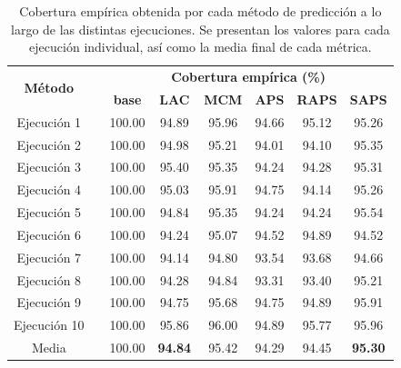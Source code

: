 \renewcommand{\arraystretch}{1.4}
\begin{table}[h]
    \centering
    \small
    \begin{tabular}{cccccccc}
    \toprule
    \multirow{2}{*}{\textbf{Método}} &  & \multicolumn{6}{c}{\textbf{Cobertura empírica (\%)}} \\ \cline{3-8} 
    &  & \textbf{base} & \textbf{LAC} & \textbf{MCM} & \textbf{APS} & \textbf{RAPS} & \textbf{SAPS} \\ \cline{1-1} \cline{3-8} 
    Ejecución 1 &  & 100.00 & 94.89 & 95.96 & 94.66 & 95.12 & 95.26 \\
    Ejecución 2 &  & 100.00 & 94.98 & 95.21 & 94.01 & 94.10 & 95.35 \\
    Ejecución 3 &  & 100.00 & 95.40 & 95.35 & 94.24 & 94.28 & 95.31 \\
    Ejecución 4 &  & 100.00 & 95.03 & 95.91 & 94.75 & 94.14 & 95.26 \\
    Ejecución 5 &  & 100.00 & 94.84 & 95.35 & 94.24 & 94.24 & 95.54 \\
    Ejecución 6 &  & 100.00 & 94.24 & 95.07 & 94.52 & 94.89 & 94.52 \\
    Ejecución 7 &  & 100.00 & 94.14 & 94.80 & 93.54 & 93.68 & 94.66 \\
    Ejecución 8 &  & 100.00 & 94.28 & 94.84 & 93.31 & 93.40 & 95.21 \\
    Ejecución 9 &  & 100.00 & 94.75 & 95.68 & 94.75 & 94.89 & 95.91 \\
    Ejecución 10 &  & 100.00 & 95.86 & 96.00 & 94.89 & 95.77 & 95.96 \\ \cline{1-1} \cline{3-8} 
    Media &  & 100.00 & \textbf{94.84} & 95.42 & 94.29 & 94.45 & \textbf{95.30} \\ 
    \bottomrule
    \end{tabular}
    \caption[
        Problema de clasificación de edad: 
        Cobertura empírica obtenida por cada método de predicción a lo largo de las distintas ejecuciones.
    ]{
        Cobertura empírica obtenida por cada método de predicción a lo largo de las distintas ejecuciones. 
        Se presentan los valores para cada ejecución individual, así como la media final de cada métrica.
    }
    \label{tab:AGC_EC_comparative}
\end{table}


